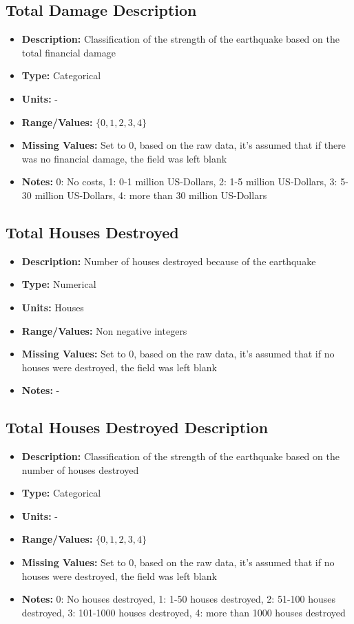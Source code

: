 \documentclass{article}
\begin{document}
\subsection{Total Damage Description}
\begin{itemize}
    \item \textbf{Description:} Classification of the strength of the earthquake based on the total financial damage
    \item \textbf{Type:} Categorical
    \item \textbf{Units:} -
    \item \textbf{Range/Values:} $\{0,1,2,3,4 \}$
    \item \textbf{Missing Values:} Set to 0, based on the raw data, it's assumed that if there was no financial damage, the field was left blank
    \item \textbf{Notes:} 0: No costs, 1: 0-1 million US-Dollars, 2: 1-5 million US-Dollars, 3: 5-30 million US-Dollars, 4: more than 30 million US-Dollars
\end{itemize}

\subsection{Total Houses Destroyed}
\begin{itemize}
    \item \textbf{Description:} Number of houses destroyed because of the earthquake
    \item \textbf{Type:} Numerical
    \item \textbf{Units:} Houses
    \item \textbf{Range/Values:} Non negative integers
    \item \textbf{Missing Values:} Set to 0, based on the raw data, it's assumed that if no houses were destroyed, the field was left blank
    \item \textbf{Notes:} -
\end{itemize}

\subsection{Total Houses Destroyed Description}
\begin{itemize}
    \item \textbf{Description:} Classification of the strength of the earthquake based on the number of houses destroyed
    \item \textbf{Type:} Categorical
    \item \textbf{Units:} -
    \item \textbf{Range/Values:} $\{0,1,2,3,4 \}$
    \item \textbf{Missing Values:} Set to 0, based on the raw data, it's assumed that if no houses were destroyed, the field was left blank
    \item \textbf{Notes:} 0: No houses destroyed, 1: 1-50 houses destroyed, 2: 51-100 houses destroyed, 3: 101-1000 houses destroyed, 4: more than 1000 houses destroyed
\end{itemize}
\end{document}
